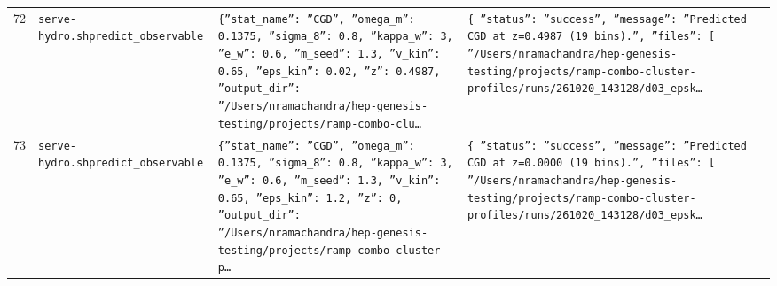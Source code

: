 \documentclass[11pt,a4paper]{article}
\begin{document}
\begin{longtable}{@{}p{}p{}p{}p{}@{}}
72 & \texttt{serve-hydro.sh}\newline\texttt{predict\_\allowbreak{}observable} & \texttt{\{''stat\_\allowbreak{}name'':\allowbreak{} ''CGD'',\allowbreak{} ''omega\_\allowbreak{}m'':\allowbreak{} 0.1375,\allowbreak{} ''sigma\_\allowbreak{}8'':\allowbreak{} 0.8,\allowbreak{} ''kappa\_\allowbreak{}w'':\allowbreak{} 3,\allowbreak{} ''e\_\allowbreak{}w'':\allowbreak{} 0.6,\allowbreak{} ''m\_\allowbreak{}seed'':\allowbreak{} 1.3,\allowbreak{} ''v\_\allowbreak{}kin'':\allowbreak{} 0.65,\allowbreak{} ''eps\_\allowbreak{}kin'':\allowbreak{} 0.02,\allowbreak{} ''z'':\allowbreak{} 0.4987,\allowbreak{} ''output\_\allowbreak{}dir'':\allowbreak{} ''/\allowbreak{}Users/\allowbreak{}nramachandra/\allowbreak{}hep-genesis-testing/\allowbreak{}projects/\allowbreak{}ramp-combo-clu\ldots{}\allowbreak{}} & \texttt{\{   ''status'':\allowbreak{} ''success'',\allowbreak{}   ''message'':\allowbreak{} ''Predicted CGD at z=\allowbreak{}0.4987 (19 bins)\allowbreak{}.'',\allowbreak{}   ''files'':\allowbreak{} [     ''/\allowbreak{}Users/\allowbreak{}nramachandra/\allowbreak{}hep-genesis-testing/\allowbreak{}projects/\allowbreak{}ramp-combo-cluster-profiles/\allowbreak{}runs/\allowbreak{}261020\_\allowbreak{}143128/\allowbreak{}d03\_\allowbreak{}epsk\ldots{}\allowbreak{}} \\
73 & \texttt{serve-hydro.sh}\newline\texttt{predict\_\allowbreak{}observable} & \texttt{\{''stat\_\allowbreak{}name'':\allowbreak{} ''CGD'',\allowbreak{} ''omega\_\allowbreak{}m'':\allowbreak{} 0.1375,\allowbreak{} ''sigma\_\allowbreak{}8'':\allowbreak{} 0.8,\allowbreak{} ''kappa\_\allowbreak{}w'':\allowbreak{} 3,\allowbreak{} ''e\_\allowbreak{}w'':\allowbreak{} 0.6,\allowbreak{} ''m\_\allowbreak{}seed'':\allowbreak{} 1.3,\allowbreak{} ''v\_\allowbreak{}kin'':\allowbreak{} 0.65,\allowbreak{} ''eps\_\allowbreak{}kin'':\allowbreak{} 1.2,\allowbreak{} ''z'':\allowbreak{} 0,\allowbreak{} ''output\_\allowbreak{}dir'':\allowbreak{} ''/\allowbreak{}Users/\allowbreak{}nramachandra/\allowbreak{}hep-genesis-testing/\allowbreak{}projects/\allowbreak{}ramp-combo-cluster-p\ldots{}\allowbreak{}} & \texttt{\{   ''status'':\allowbreak{} ''success'',\allowbreak{}   ''message'':\allowbreak{} ''Predicted CGD at z=\allowbreak{}0.0000 (19 bins)\allowbreak{}.'',\allowbreak{}   ''files'':\allowbreak{} [     ''/\allowbreak{}Users/\allowbreak{}nramachandra/\allowbreak{}hep-genesis-testing/\allowbreak{}projects/\allowbreak{}ramp-combo-cluster-profiles/\allowbreak{}runs/\allowbreak{}261020\_\allowbreak{}143128/\allowbreak{}d03\_\allowbreak{}epsk\ldots{}\allowbreak{}} \\

\end{longtable}
\end{document}
